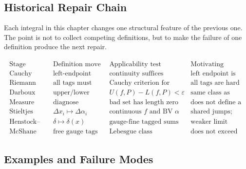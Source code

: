 \subsection*{Historical Repair Chain}

\begin{exposition}
Each integral in this chapter changes one structural feature of the previous
one. The point is not to collect competing definitions, but to make the
failure of one definition produce the next repair.

\[
\begin{aligned}
\begin{array}{c|c|c|c}
\text{Stage} & \text{Definition move} & \text{Applicability test} &
\text{Motivating failure}\\
\hline
\text{Cauchy} &
\text{left-endpoint sums} &
\text{continuity suffices} &
\text{left endpoint is privileged}\\
\text{Riemann} &
\text{all tags must agree} &
\text{Cauchy criterion for sums} &
\text{all tags are hard to control}\\
\text{Darboux} &
\text{upper/lower sums} &
U(f,P)-L(f,P)<\varepsilon &
\text{same class as Riemann}\\
\text{Measure zero} &
\text{diagnose discontinuities} &
\text{bad set has length zero} &
\text{does not define a new integral here}\\
\text{Stieltjes} &
\Delta x_i\mapsto\Delta\alpha_i &
\text{continuous }f\text{ and BV }\alpha &
\text{shared jumps; rough rulers}\\
\text{Henstock--Kurzweil} &
\delta\mapsto\delta(x) &
\text{gauge-fine tagged sums} &
\text{weaker limit machinery}\\
\text{McShane} &
\text{free gauge tags} &
\text{Lebesgue class} &
\text{does not exceed HK}
\end{array}
\end{aligned}
\]
\end{exposition}

\subsection*{Examples and Failure Modes}

